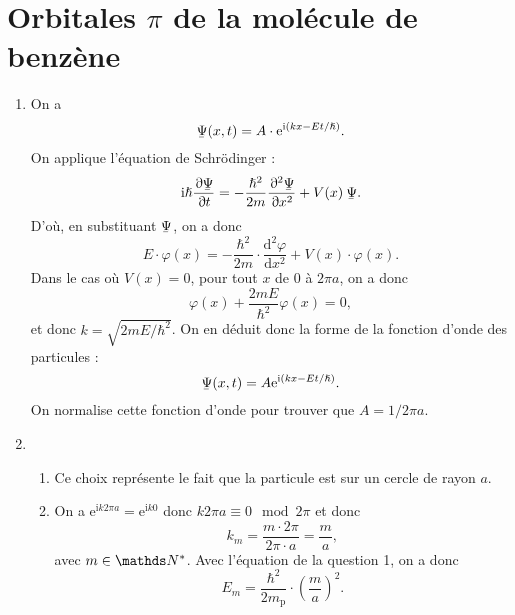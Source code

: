 \section{Orbitales $\pi$ de la molécule de benzène}

\begin{enumerate}
	\item On a \[
			\ubar{\Psi}(x,t) = A \cdot \mathrm{e}^{\mathrm{i}(kx - Et / \hbar)}
		.\]
		On applique l'équation de Schrödinger : \[
			\mathrm{i} \hbar  \frac{\partial \ubar{\Psi}}{\partial t} = -\frac{\hbar^2}{2m} \frac{\partial^2 \ubar{\Psi}}{\partial x^2} + V(x) \: \ubar{\Psi}
		.\]
		D'où, en substituant $\ubar{\Psi}$, on a donc \[
			E \cdot \varphi(x) = - \frac{\hbar^2}{2m} \cdot \frac{\mathrm{d}^2 \varphi}{\mathrm{d}x^2} + V(x) \cdot \varphi(x)
		.\]
		Dans le cas où $V(x) = 0$, pour tout $x$ de $0$ à $2\pi a$, on a donc \[
			\varphi(x) + \frac{2mE}{\hbar^2} \varphi(x) = 0
		,\] et donc $k = \sqrt{2m E / \hbar^2}$.
		On en déduit donc la forme de la fonction d'onde des particules : \[
			\ubar{\Psi}(x,t) = A \mathrm{e}^{\mathrm{i}(kx - E t /\hbar)}
		.\]
		On normalise cette fonction d'onde pour trouver que $A = 1 / 2\pi a$.
	\item 
		\begin{enumerate}
			\item Ce choix représente le fait que la particule est sur un cercle de rayon $a$.
			\item On a $\mathrm{e}^{\mathrm{i} k 2\pi a} = \mathrm{e}^{\mathrm{i} k 0}$ donc $k 2\pi a \equiv 0 \mod {2\pi}$ et donc \[
					k_m = \frac{m \cdot 2\pi}{2\pi \cdot a} = \frac{m}{a}
				,\] avec $m \in \N^*$.
				Avec l'équation de la question 1, on a donc \[
					E_m = \frac{\hbar^2}{2m_\mathrm{p} } \cdot \left( \frac{m}{a} \right)^2
				.\] 
		\end{enumerate}
\end{enumerate}

